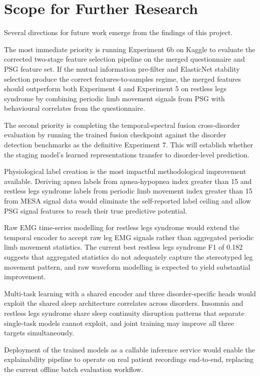 \section{Scope for Further Research}

Several directions for future work emerge from the findings of this project.

The most immediate priority is running Experiment 6b on Kaggle to evaluate the corrected two-stage feature selection pipeline on the merged questionnaire and PSG feature set. If the mutual information pre-filter and ElasticNet stability selection produce the correct features-to-samples regime, the merged features should outperform both Experiment 4 and Experiment 5 on restless legs syndrome by combining periodic limb movement signals from PSG with behavioural correlates from the questionnaire.

The second priority is completing the temporal-spectral fusion cross-disorder evaluation by running the trained fusion checkpoint against the disorder detection benchmarks as the definitive Experiment 7. This will establish whether the staging model's learned representations transfer to disorder-level prediction.

Physiological label creation is the most impactful methodological improvement available. Deriving apnea labels from apnea-hypopnea index greater than 15 and restless legs syndrome labels from periodic limb movement index greater than 15 from MESA signal data would eliminate the self-reported label ceiling and allow PSG signal features to reach their true predictive potential.

Raw EMG time-series modelling for restless legs syndrome would extend the temporal encoder to accept raw leg EMG signals rather than aggregated periodic limb movement statistics. The current best restless legs syndrome F1 of 0.182 suggests that aggregated statistics do not adequately capture the stereotyped leg movement pattern, and raw waveform modelling is expected to yield substantial improvement.

Multi-task learning with a shared encoder and three disorder-specific heads would exploit the shared sleep architecture correlates across disorders. Insomnia and restless legs syndrome share sleep continuity disruption patterns that separate single-task models cannot exploit, and joint training may improve all three targets simultaneously.

Deployment of the trained models as a callable inference service would enable the explainability pipeline to operate on real patient recordings end-to-end, replacing the current offline batch evaluation workflow.


